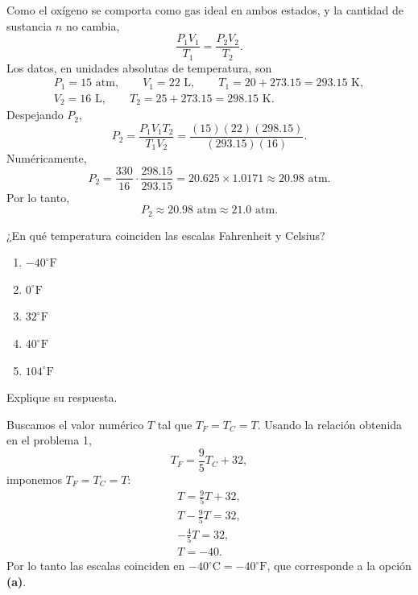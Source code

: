 \documentclass[12pt,a4paper]{article}
\begin{document}
    \begin{solucion}
        Como el oxígeno se comporta como gas ideal en ambos estados, y la cantidad de sustancia
        $n$ no cambia,
        \begin{equation*}
            \frac{P_{1}V_{1}}{T_{1}}=\frac{P_{2}V_{2}}{T_{2}}.
        \end{equation*}
        Los datos, en unidades absolutas de temperatura, son
        \begin{gather*}
            P_{1}=15\text{ atm}, \qquad V_{1}=22\text{ L}, \qquad T_{1}=20+273.15=293.15\text{ K},\\
            V_{2}=16\text{ L}, \qquad T_{2}=25+273.15=298.15\text{ K}.
        \end{gather*}
        Despejando $P_{2}$,
        \begin{equation*}
            P_{2}=\frac{P_{1}V_{1}T_{2}}{T_{1}V_{2}}=\frac{(15)(22)(298.15)}{(293.15)(16)}.
        \end{equation*}
        Numéricamente,
        \begin{equation*}
            P_{2}=\frac{330}{16}\cdot\frac{298.15}{293.15}=20.625\times1.0171\approx20.98\text{ atm}.
        \end{equation*}
        Por lo tanto,
        \begin{equation*}
            P_{2}\approx20.98\text{ atm}\approx21.0\text{ atm}.
        \end{equation*}
    \end{solucion}

    \begin{problema}
        ¿En qué temperatura coinciden las escalas Fahrenheit y Celsius?
        \begin{enumerate}
            \item[(a)] $-40^{\circ}\text{F}$
            \item[(b)] $0^{\circ}\text{F}$
            \item[(c)] $32^{\circ}\text{F}$
            \item[(d)] $40^{\circ}\text{F}$
            \item[(e)] $104^{\circ}\text{F}$
        \end{enumerate}
        Explique su respuesta.
    \end{problema}

    \begin{solucion}
        Buscamos el valor numérico $T$ tal que $T_{F}=T_{C}=T$. Usando la relación obtenida en el
        problema 1,
        \begin{equation*}
            T_{F}=\frac{9}{5}T_{C}+32,
        \end{equation*}
        imponemos $T_{F}=T_{C}=T$:
        \begin{gather*}
            T=\frac{9}{5}T+32,\\
            T-\frac{9}{5}T=32,\\
            -\frac{4}{5}T=32,\\
            T=-40.
        \end{gather*}
        Por lo tanto las escalas coinciden en $-40^{\circ}\text{C}=-40^{\circ}\text{F}$, que
        corresponde a la opción \textbf{(a)}.
    \end{solucion}
\end{document}

